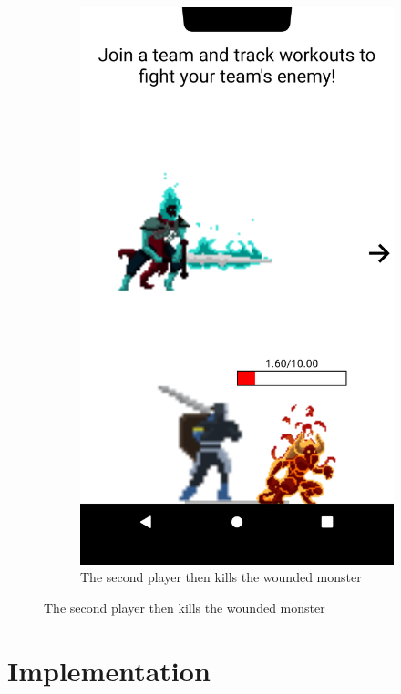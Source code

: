 \documentclass{l4proj}
\begin{document}
\begin{figure}[H]
\begin{subfigure}{0.45\textwidth}
        \includegraphics[width=\textwidth]{lower_attack.png}
        \caption{The second player then kills the wounded monster} 
    \end{subfigure}
\end{figure}









\chapter{Implementation}
\end{document}
